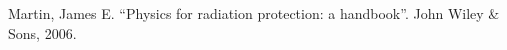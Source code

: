 \begin{thebibliography}{99}
 Martin, James E. ``Physics for radiation protection: a
      handbook''. John Wiley \& Sons, 2006.
  





\end{thebibliography}
